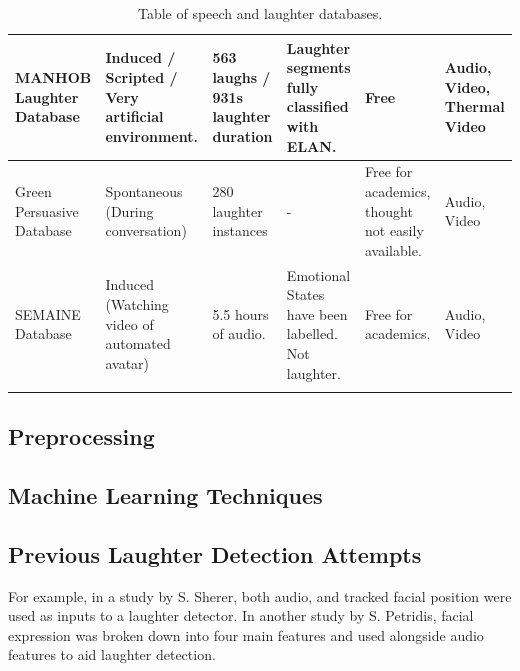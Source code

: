 \documentclass[a4paper,11pt,notitlepage]{article}
\begin{document}
\begin{landscape}
\begin{longtable}{|p{3cm}|p{4cm}|p{2cm}|p{3cm}|p{3.5cm}|p{3cm}|}
MANHOB Laughter Database & Induced / Scripted / Very artificial environment. & 563 laughs / 931s laughter duration & Laughter segments fully classified with ELAN. & Free & Audio, Video, Thermal Video \\ \hline

Green Persuasive Database & Spontaneous (During conversation) & 280 laughter instances & - & Free for academics, thought not easily available. & Audio, Video \\ \hline

SEMAINE Database & Induced (Watching video of automated avatar) & 5.5 hours of audio. & Emotional States have been labelled. Not laughter. & Free for academics. & Audio, Video \\ \hline

\caption{Table of speech and laughter databases.}
\label{table:table_of_databases}
\end{longtable}
\end{landscape}

\subsection{Preprocessing}


\subsection{Machine Learning Techniques}


\subsection{Previous Laughter Detection Attempts}


For example, in a study by S. Sherer, both audio, and tracked facial position were used as inputs to a laughter detector.\cite{scherer2009multimodal} In another study by S. Petridis, facial expression was broken down into four main features and used alongside audio features to aid laughter detection.\cite{petridis2008audiovisual}
\end{document}
